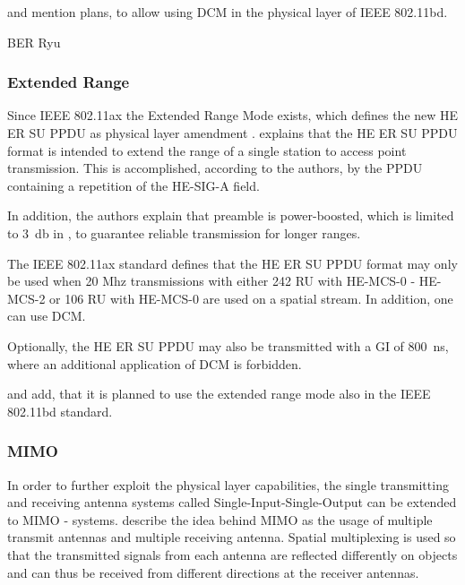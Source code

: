 \textcite{jacob_system-level_2020} and \textcite{triwinarko_phy_2021} mention plans, to allow using \ac{DCM} in the physical layer of IEEE 802.11bd.

BER Ryu

\subsubsection*{Extended Range}
Since IEEE 802.11ax the Extended Range Mode exists, which defines the new HE ER SU \ac{PPDU} as physical layer amendment \cite{noauthor_ieee_2021} \cite{afaqui_ieee_2017}.
\textcite{deng_ieee_2017} explains that the HE ER SU \ac{PPDU} format is intended to extend the range of a single station to access point transmission. This is accomplished, according to the authors, by the PPDU containing a repetition of the HE-SIG-A field.

In addition, the authors explain that preamble is power-boosted, which is limited to \SI{3}{\decibel} in \cite{noauthor_ieee_2021} \cite{jacob_system-level_2020}, to guarantee reliable transmission for longer ranges.

The IEEE 802.11ax \cite{noauthor_ieee_2021} standard defines that the HE ER SU \ac{PPDU} format may only be used when 20 Mhz transmissions with either 242 RU with HE-MCS-0 - HE-MCS-2 or 106 RU with HE-MCS-0 are used on a spatial stream. In addition, one can use \ac{DCM}.

Optionally, the HE ER SU \ac{PPDU} may also be transmitted with a \ac{GI} of \SI{800}{\nano\second}, where an additional application of \ac{DCM} is forbidden. 
	
\textcite{jacob_system-level_2020} and \textcite{triwinarko_phy_2021} add, that it is planned to use the extended range mode also in the IEEE 802.11bd standard.

\subsubsection*{\acf{MIMO}}
In order to further exploit the physical layer capabilities, the single transmitting and receiving antenna systems called Single-Input-Single-Output can be extended to \ac{MIMO} - systems.
\textcite{sauter_wireless_2022} describe the idea behind \ac{MIMO} as the usage of multiple transmit antennas and multiple receiving antenna. Spatial multiplexing is used so that the transmitted signals
from each antenna are reflected differently on objects and can thus be received from different directions at the receiver antennas.

